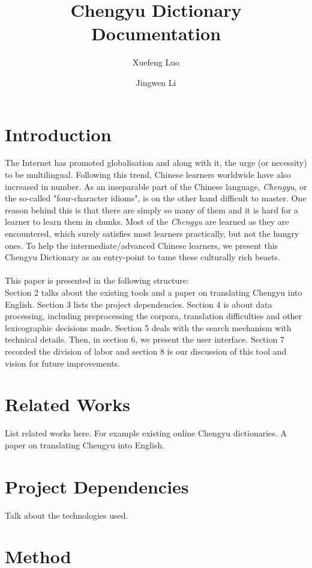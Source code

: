 \documentclass[11pt]{article} %
\title{Chengyu Dictionary Documentation} %
\author{Xuefeng Luo \and Jingwen Li}
\date{}	%
\begin{document}
\maketitle

\section{Introduction}
\indent The Internet has promoted globalisation and along with it, the urge (or necessity) to be multilingual. Following this trend, Chinese learners worldwide have also increased in number. As an inseparable part of the Chinese language, \textit{Chengyu}, or the so-called "four-character idioms", is on the other hand difficult to master. One reason behind this is that there are simply so many of them and it is hard for a learner to learn them in chunks. Most of the \textit{Chengyu} are learned as they are encountered, which surely satisfies most learners practically, but not the hungry ones. To help the intermediate/advanced Chinese learners, we present this Chengyu Dictionary as an entry-point to tame these culturally rich beasts.\\
\\
\indent This paper is presented in the following structure:\\
Section 2 talks about the existing tools and a paper on translating Chengyu into English. Section 3 lists the project dependencies. Section 4 is about data processing, including preprocessing the corpora, translation difficulties and other lexicographic decisions made. Section 5 deals with the search mechanism with technical details. Then, in section 6, we present the user interface. Section 7 recorded the division of labor and section 8 is our discussion of this tool and vision for future improvements.

\section{Related Works}
\indent List related works here. For example existing online Chengyu dictionaries. A paper on translating Chengyu into English.

\section{Project Dependencies}
\indent Talk about the technologies used.

\section{Method}
\end{document}
